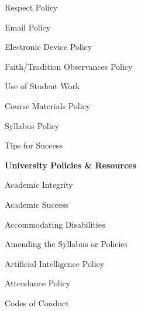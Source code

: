 \documentclass[11pt,letterpaper]{article}
\begin{document}
\begin{minipage}[t]{0.45\textwidth}
\hspace{0.3cm} Respect Policy \dotfill \pageref{respect} \par
\hspace{0.3cm} Email Policy \dotfill \pageref{email_policy} \par 
\hspace{0.3cm} Electronic Device Policy \dotfill \pageref{electronic} \par
\hspace{0.3cm} Faith/Tradition Observances Policy \dotfill \pageref{faith} \par
\hspace{0.3cm} Use of Student Work \dotfill \pageref{std_work} 
\end{minipage} \hfill \begin{minipage}[t]{0.45\textwidth} \par %
\hspace{0.3cm} Course Materials Policy \dotfill \pageref{copyright} \par
\hspace{0.3cm} Syllabus Policy \dotfill \pageref{syllabus} \par
\hspace{0.3cm} Tips for Success \dotfill \pageref{tips} \par
{\bfseries\color{scred} University Policies \& Resources} \dotfill \pageref{univ_policies} \par
\hspace{0.3cm} Academic Integrity \dotfill \pageref{univ_academicintegrity} \par
\hspace{0.3cm} Academic Success \dotfill \pageref{univ_success} \par
\hspace{0.3cm} Accommodating Disabilities \dotfill \pageref{univ_ada} \par
\hspace{0.3cm} Amending the Syllabus or Policies \dotfill \pageref{univ_amending} \par
\hspace{0.3cm} Artificial Intelligence Policy \dotfill \pageref{univ_artintel} \par
\hspace{0.3cm} Attendance Policy \dotfill \pageref{univ_attendance} \par
\hspace{0.3cm} Codes of Conduct \dotfill \pageref{univ_conduct} \par

\end{minipage}
\end{document}
